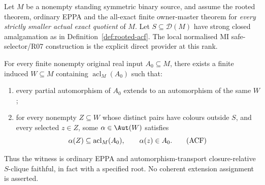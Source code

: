 \begin{lemma}
\label{lem:acf-rank-step}
Let \(M\) be a nonempty standing symmetric binary source,
and assume the rooted theorem, ordinary EPPA and the all-exact
finite owner-master theorem for \emph{every strictly smaller
actual exact quotient} of \(M\).  Let
\(S\subseteq\mathcal D(M)\) have strong closed
amalgamation as in Definition~\ref{def:rooted-acf}.
The local normalised MI safe-selector/R07 construction is the
explicit direct provider at this rank.

For every finite nonempty original real input
\(A_0\subseteq M\), there exists a finite induced
\(W\subseteq M\) containing \(\operatorname{acl}_M(A_0)\)
such that:
\begin{enumerate}
\item every partial automorphism of \(A_0\) extends to
  an automorphism of the same \(W\);
\item for every nonempty \(Z\subseteq W\) whose distinct
  pairs have colours outside \(S\), and every selected
  \(z\in Z\), some \(\alpha\in\Aut(W)\) satisfies
  \[
       \alpha(Z)\subseteq\operatorname{acl}_M(A_0),
                 \qquad \alpha(z)\in A_0 .
                 \tag{\(\mathrm{ACF}\)}\label{eq:acf-main}
  \]
\end{enumerate}
Thus the witness is ordinary EPPA and
automorphism-transport closure-relative
\(S\)-clique faithful, in fact with a specified
root.  No coherent extension assignment is asserted.
\end{lemma}
